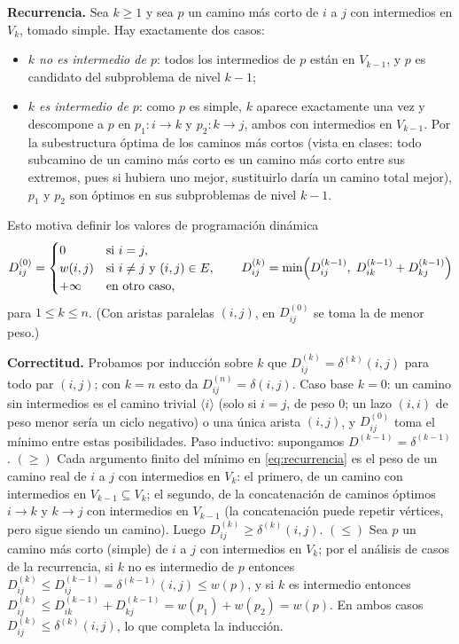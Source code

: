 \documentclass[11pt]{article}
\begin{document}
\textbf{Recurrencia.} Sea $k\ge 1$ y sea $p$ un camino más corto de $i$ a
$j$ con intermedios en $V_k$, tomado simple. Hay exactamente dos casos:
\begin{itemize}
  \item \emph{$k$ no es intermedio de $p$}: todos los intermedios de $p$
  están en $V_{k-1}$, y $p$ es candidato del subproblema de nivel $k-1$;
  \item \emph{$k$ es intermedio de $p$}: como $p$ es simple, $k$ aparece
  exactamente una vez y descompone a $p$ en $p_1\colon i\to k$ y
  $p_2\colon k\to j$, ambos con intermedios en $V_{k-1}$. Por la
  subestructura óptima de los caminos más cortos (vista en clases: todo
  subcamino de un camino más corto es un camino más corto entre sus
  extremos, pues si hubiera uno mejor, sustituirlo daría un camino total
  mejor), $p_1$ y $p_2$ son óptimos en sus subproblemas de nivel $k-1$.
\end{itemize}
Esto motiva definir los valores de programación dinámica
\begin{equation}\label{eq:recurrencia}
D^{(0)}_{ij}=
\begin{cases}
0 & \text{si } i=j,\\
w(i,j) & \text{si } i\ne j \text{ y } (i,j)\in E,\\
+\infty & \text{en otro caso,}
\end{cases}
\qquad
D^{(k)}_{ij}=\min\Bigl(D^{(k-1)}_{ij},\; D^{(k-1)}_{ik}+D^{(k-1)}_{kj}\Bigr)
\end{equation}
para $1\le k\le n$. (Con aristas paralelas $(i,j)$, en $D^{(0)}_{ij}$ se
toma la de menor peso.)

\textbf{Correctitud.} Probamos por inducción sobre $k$ que
$D^{(k)}_{ij}=\delta^{(k)}(i,j)$ para todo par $(i,j)$; con $k=n$ esto da
$D^{(n)}_{ij}=\delta(i,j)$. Caso base $k=0$: un camino sin intermedios es el
camino trivial $\langle i\rangle$ (solo si $i=j$, de peso $0$; un lazo
$(i,i)$ de peso menor sería un ciclo negativo) o una única arista $(i,j)$,
y $D^{(0)}_{ij}$ toma el mínimo entre estas posibilidades. Paso inductivo:
supongamos $D^{(k-1)}=\delta^{(k-1)}$.
$(\ge)$ Cada argumento finito del mínimo en \eqref{eq:recurrencia} es el
peso de un camino real de $i$ a $j$ con intermedios en $V_k$: el primero, de
un camino con intermedios en $V_{k-1}\subseteq V_k$; el segundo, de la
concatenación de caminos óptimos $i\to k$ y $k\to j$ con intermedios en
$V_{k-1}$ (la concatenación puede repetir vértices, pero sigue siendo un
camino). Luego $D^{(k)}_{ij}\ge\delta^{(k)}(i,j)$.
$(\le)$ Sea $p$ un camino más corto (simple) de $i$ a $j$ con intermedios en
$V_k$; por el análisis de casos de la recurrencia, si $k$ no es intermedio
de $p$ entonces $D^{(k)}_{ij}\le D^{(k-1)}_{ij}=\delta^{(k-1)}(i,j)\le w(p)$,
y si $k$ es intermedio entonces
$D^{(k)}_{ij}\le D^{(k-1)}_{ik}+D^{(k-1)}_{kj}=w(p_1)+w(p_2)=w(p)$. En ambos
casos $D^{(k)}_{ij}\le\delta^{(k)}(i,j)$, lo que completa la inducción.
\end{document}
